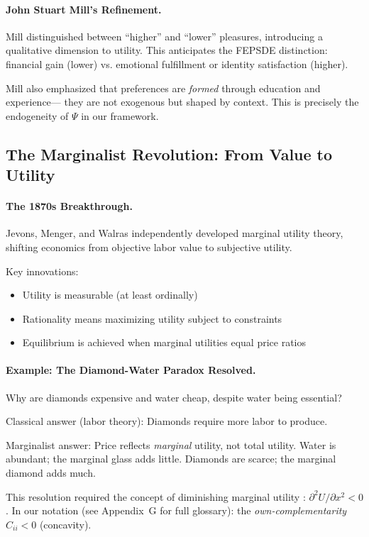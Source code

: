 \paragraph{John Stuart Mill's Refinement.}
Mill \citep{mill1848} distinguished between ``higher'' and ``lower'' pleasures,
introducing a qualitative dimension to utility.
This anticipates the FEPSDE distinction:
financial gain (lower) vs. emotional fulfillment or identity satisfaction (higher).

Mill also emphasized that preferences are \emph{formed} through education and experience---
they are not exogenous but shaped by context.
This is precisely the endogeneity of $\Psi$ in our framework.

\subsection{The Marginalist Revolution: From Value to Utility}

\paragraph{The 1870s Breakthrough.}
Jevons, Menger, and Walras independently developed marginal utility theory,
shifting economics from objective labor value to subjective utility.

Key innovations:
\begin{itemize}
  \item Utility is measurable (at least ordinally)
  \item Rationality means maximizing utility subject to constraints
  \item Equilibrium is achieved when marginal utilities equal price ratios
\end{itemize}

\paragraph{Example: The Diamond-Water Paradox Resolved.}
Why are diamonds expensive and water cheap, despite water being essential?

Classical answer (labor theory): Diamonds require more labor to produce.

Marginalist answer: Price reflects \emph{marginal} utility, not total utility.
Water is abundant; the marginal glass adds little. Diamonds are scarce; the marginal diamond adds much.

This resolution required the concept of diminishing marginal utility \citep{marshall1890}:
$\partial^2 U / \partial x^2 < 0$.
In our notation (see Appendix~G for full glossary): the \emph{own-complementarity} $C_{ii} < 0$ (concavity).

